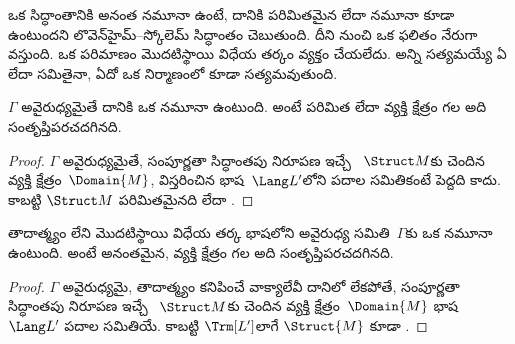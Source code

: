 \documentclass[../../../include/open-logic-section]{subfiles}
\begin{document}

ఒక సిద్ధాంతానికి అనంత నమూనా ఉంటే, దానికి పరిమితమైన లేదా 
నమూనా కూడా ఉంటుందని లొవెన్‌హైమ్--స్కోలెమ్ సిద్ధాంతం చెబుతుంది.
దీని నుంచి ఒక ఫలితం నేరుగా వస్తుంది. ఒక  పరిమాణం
 మొదటిస్థాయి విధేయ తర్కం వ్యక్తం చేయలేదు. అన్ని
  సత్యమయ్యే ఏ  లేదా
 సమితైనా, ఏదో ఒక  నిర్మాణంలో కూడా
సత్యమవుతుంది.

\begin{thm}
 $\Gamma$ అవైరుధ్యమైతే దానికి ఒక
 నమూనా ఉంటుంది. అంటే పరిమిత లేదా 
వ్యక్తి క్షేత్రం గల  అది సంతృప్తిపరచదగినది.
\end{thm}

\begin{proof}
$\Gamma$ అవైరుధ్యమైతే, సంపూర్ణతా సిద్ధాంతపు నిరూపణ ఇచ్చే
~$\Struct M$కు చెందిన వ్యక్తి క్షేత్రం~$\Domain{M}$, విస్తరించిన భాష~$\Lang L'$లోని
పదాల సమితికంటే పెద్దది కాదు. కాబట్టి $\Struct M$ పరిమితమైనది లేదా
.
\end{proof}

\begin{thm}
 తాదాత్మ్యం లేని మొదటిస్థాయి విధేయ తర్క భాషలోని
 అవైరుధ్య సమితి~$\Gamma$కు ఒక  నమూనా
ఉంటుంది. అంటే అనంతమైన,  వ్యక్తి క్షేత్రం గల 
అది సంతృప్తిపరచదగినది.
\end{thm}

\begin{proof}
$\Gamma$ అవైరుధ్యమై, తాదాత్మ్యం కనిపించే వాక్యాలేవీ దానిలో లేకపోతే,
సంపూర్ణతా సిద్ధాంతపు నిరూపణ ఇచ్చే ~$\Struct M$కు చెందిన
వ్యక్తి క్షేత్రం~$\Domain{M}$ భాష~$\Lang L'$ పదాల సమితియే.
కాబట్టి $\Trm[L']$లాగే $\Struct{M}$ కూడా .
\end{proof}
\end{document}
